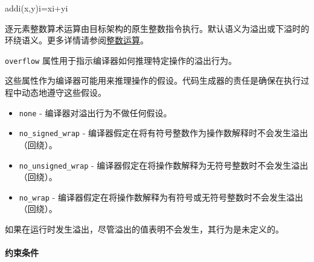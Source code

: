 \documentclass{article}
\begin{document}
addi(x,y)i=xi+yi


逐元素整数算术运算由目标架构的原生整数指令执行。默认语义为溢出或下溢时的环绕语义。更多详情请参阅\href{https://docs.nvidia.com/cuda/tile-ir/latest/sections/operations.html#op-group-integer}{整数运算}。



\texttt{overflow} 属性用于指示编译器如何推理特定操作的溢出行为。



这些属性作为编译器可能用来推理操作的假设。代码生成器的责任是确保在执行过程中动态地遵守这些假设。



\begin{itemize}
\item \texttt{none} - 编译器对溢出行为不做任何假设。
\item \texttt{no\_signed\_wrap} - 编译器假定在将有符号整数作为操作数解释时不会发生溢出（回绕）。
\item \texttt{no\_unsigned\_wrap} - 编译器假定在将操作数解释为无符号整数时不会发生溢出（回绕）。
\item \texttt{no\_wrap} - 编译器假定在将操作数解释为有符号或无符号整数时不会发生溢出（回绕）。


\end{itemize}
如果在运行时发生溢出，尽管溢出的值表明不会发生，其行为是未定义的。





\paragraph{约束条件}
\end{document}
